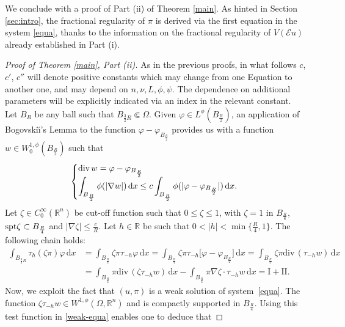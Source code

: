 \documentclass[leqno,11pt]{amsart}%
\numberwithin{equation}{section}
\newcommand{\dive}{\mathrm{div}\,}
\def\R{\mathbb R}
\def\Rn{{\mathbb R}^{n}}
\def\rn{\Rn}
\def\d{\mathrm{d}}
\def\E{\mathcal{E}}
\def\dx{\d x}
\theoremstyle{definition}
\numberwithin{equation}{section}
\begin{document}
We conclude with a proof of Part (ii) of Theorem \ref{main}. As hinted in Section \ref{sec:intro}, the fractional regularity of $\pi$ is derived via the first equation in the system \eqref{equa}, thanks to the information on the fractional regularity of $V(\E u)$ already established in Part (i).


\begin{proof}[Proof of Theorem \ref{main}, Part (ii)] 
   As in the previous proofs, in what follows $c$, $c'$, $c''$ will denote positive constants which  may change from one Equation to another one, and may depend on $n, \nu, L, \phi, \psi$.
  The dependence on additional parameters will be explicitly indicated via an index in the relevant constant.
\\
Let $B_R$ be any ball such that $B_{\frac 32R} \Subset \Omega$.
 Given $\varphi\in L^{\phi}(B_{\frac R2}) $,
 an application   of Bogovski\u\i's Lemma  to the function $\varphi-\varphi_{B_{\frac R2}}$ provides us with a function $w\in W^{1,\phi}_0(B_{\frac R2})$ such that
     \begin{equation}\label{Bogw}
         \begin{cases}
             \mathrm{div}\,w=\varphi-\varphi_{B_{\frac R2}}\cr 
        \displaystyle\int_{B_{\frac R2}}\phi(|\nabla w|)\,\dx\le c \int_{B_{\frac R2}}\phi(|\varphi-\varphi_{B_{\frac R2}}|)\,\dx.
         \end{cases}
     \end{equation}
Let  $\zeta\in
C^\infty_0(\rn)$ be cut-off function such that  $0\leq \zeta \le 1$, with $\zeta =1$ in $B_{\frac R8}$,  ${\rm spt} \zeta \subset B_{\frac R4}$ and
$|\nabla\zeta|\le\frac cR$.
Let $h\in \mathbb R$ be such that $0<|h|<  \min\{\frac R4, 1\}$. The following chain holds:  
\begin{align}\label{eta-pi-dual}
  \int_{B_{{\frac 34R}}}\tau_h(\zeta\pi)\varphi\,\dx
 & =
  \int_{B_{\frac R4}}\zeta\pi\tau_{-h}\varphi\,\dx
  =
  \int_{B_{\frac R4}}\zeta\pi\tau_{-h}\big[\varphi-\varphi_{B_{\frac R2}}\big]\,\dx =
  \int_{B_{\frac R4}}\zeta\pi\dive(\tau_{-h}w)\,\dx\\\nonumber
  &=
  \int_{B_{\frac R4}}\pi\dive(\zeta\tau_{-h}w)\,\dx
  -
  \int_{B_{\frac R4}}\pi\nabla\zeta\cdot\tau_{-h}w\,\dx = \mathrm{I}+\mathrm{II}.
\end{align}
Now, we exploit the fact that $(u,\pi)$ is a weak solution of
system~\eqref{equa}. The function $\zeta\tau_{-h}w\in W^{1,\phi}(\Omega,\R^n)$ and is compactly supported in $B_{\frac R4}$. Using this  test function
in \eqref{weak-equa} enables one to deduce that

\end{proof}
\end{document}
